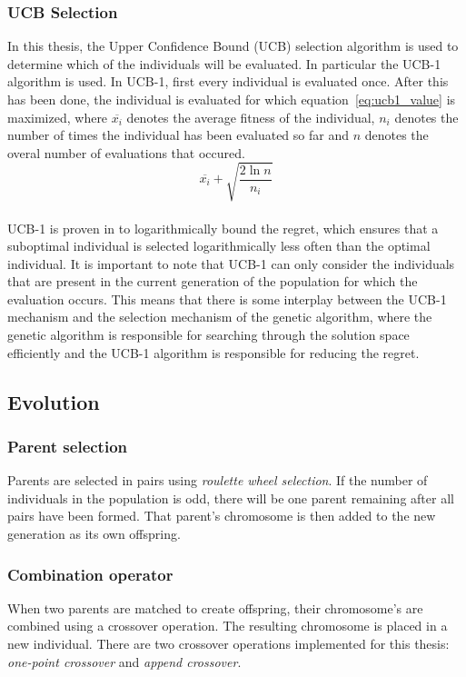 \subsubsection{UCB Selection}
\label{sec:approach_ucb}
In this thesis, the Upper Confidence Bound (UCB) selection algorithm is used to
determine which of the individuals will be evaluated. In
particular the UCB-1 \citep{Auer2002} algorithm is used. In UCB-1,
first every individual is evaluated once. After this has been done, the
individual is evaluated for which equation~\eqref{eq:ucb1_value} is maximized,
where $\overline{x_i}$ denotes the average fitness of the individual, $n_i$
denotes the number of times the individual has been evaluated so far and $n$
denotes the overal number of evaluations that occured.\\
\begin{equation}
	\overline{x_i} + \sqrt{\frac{2 \ln n}{n_i}}
	\label{eq:ucb1_value}
\end{equation}\\
\noindent
UCB-1 is proven in \citep{Auer2002} to logarithmically bound the
regret, which ensures that a suboptimal individual is selected logarithmically
less often than the optimal individual. It is important to note that UCB-1 can
only consider the individuals that are present in the current generation of the
population for which the evaluation occurs. This means that there is some
interplay between the UCB-1 mechanism and the selection mechanism of the
genetic algorithm, where the genetic algorithm is responsible for searching
through the solution space efficiently and the UCB-1 algorithm is responsible
for reducing the regret.

\subsection{Evolution}
\label{sec:approach_generation_switch}
\subsubsection{Parent selection}
\label{sec:approach_parent_selection}
Parents are selected in pairs using \emph{roulette wheel selection}. If the number of
individuals in the population is odd, there will be one parent remaining after
all pairs have been formed. That parent's chromosome is then added to the new
generation as its own offspring.
\subsubsection{Combination operator}
\label{sec:approach_combination_operator}
When two parents are matched to create offspring, their chromosome's are
combined using a crossover operation. The resulting chromosome is placed in a
new individual. There are two crossover operations implemented for this thesis:
\emph{one-point crossover} and \emph{append crossover}.

